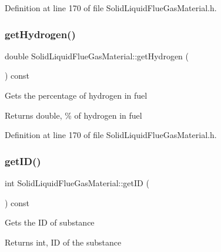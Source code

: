 Definition at line 170 of file Solid\+Liquid\+Flue\+Gas\+Material.\+h.

\mbox{\label{class_solid_liquid_flue_gas_material_a26af2edd53c50b071648d03bc6442fb6}} 
\subsubsection{\texorpdfstring{get\+Hydrogen()}{getHydrogen()}\hspace{0.1cm}{\footnotesize\ttfamily [3/3]}}
{\footnotesize\ttfamily double Solid\+Liquid\+Flue\+Gas\+Material\+::get\+Hydrogen (\begin{DoxyParamCaption}{ }\end{DoxyParamCaption}) const\hspace{0.3cm}{\ttfamily [inline]}}

Gets the percentage of hydrogen in fuel \begin{DoxyReturn}{Returns}
double, \% of hydrogen in fuel 
\end{DoxyReturn}


Definition at line 170 of file Solid\+Liquid\+Flue\+Gas\+Material.\+h.

\mbox{\label{class_solid_liquid_flue_gas_material_afb124b546137da7ba99e31616198e0c8}} 
\subsubsection{\texorpdfstring{get\+I\+D()}{getID()}\hspace{0.1cm}{\footnotesize\ttfamily [1/3]}}
{\footnotesize\ttfamily int Solid\+Liquid\+Flue\+Gas\+Material\+::get\+ID (\begin{DoxyParamCaption}{ }\end{DoxyParamCaption}) const\hspace{0.3cm}{\ttfamily [inline]}}

Gets the ID of substance \begin{DoxyReturn}{Returns}
int, ID of the substance 
\end{DoxyReturn}


